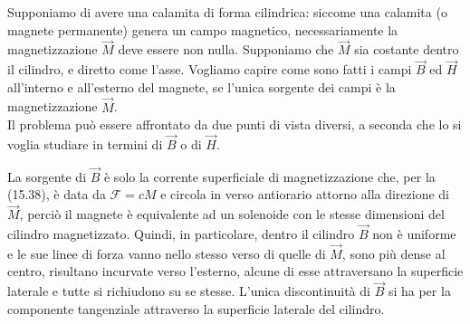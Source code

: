 Supponiamo di avere una calamita di forma cilindrica: siccome una calamita (o
magnete permanente) genera un campo magnetico, necessariamente la
magnetizzazione $\vec M$ deve essere non nulla. Supponiamo che $\vec M$ sia
costante dentro il cilindro, e diretto come l'asse. Vogliamo capire come sono
fatti i campi $\vec B$ ed $\vec H$ all'interno e all'esterno del magnete, se
l'unica sorgente dei campi \`e la magnetizzazione $\vec M$.\\
Il problema pu\`o essere affrontato da due punti di vista diversi, a seconda che
lo si voglia studiare in termini di $\vec B$ o di $\vec H$.

La sorgente di $\vec B$ \`e solo la corrente superficiale di magnetizzazione
che, per la (15.38), \`e data da $\mathcal F=cM$ e circola in verso antiorario
attorno alla direzione di $\vec M$, perci\`o il magnete \`e equivalente ad un
solenoide con le stesse dimensioni del cilindro magnetizzato. Quindi, in
particolare, dentro il cilindro $\vec B$ non \`e uniforme e le sue linee di
forza vanno nello stesso verso di quelle di $\vec M$, sono pi\`u dense al
centro, risultano incurvate verso l'esterno, alcune di esse attraversano la
superficie laterale e tutte si richiudono su se stesse. L'unica discontinuit\`a
di $\vec B$ si ha per la componente tangenziale attraverso la superficie
laterale del cilindro.

